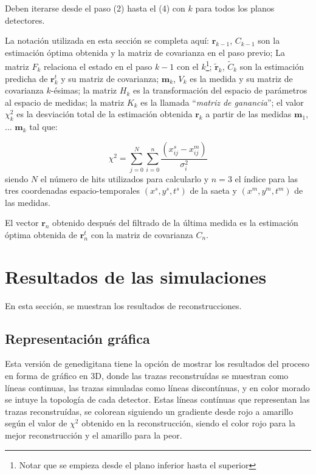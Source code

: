 \documentclass[a4paper]{article}
\let\vec\mathbf  %
\begin{document}
Deben iterarse desde el paso (2) hasta el (4) con $k$ para todos los planos detectores.

La notación utilizada en esta sección se completa aquí: $\vec{r}_{k - 1}$, $C_{k - 1}$ son la estimación óptima obtenida y la matriz de covarianza en el paso previo; La matriz $F_k$ relaciona el estado en el paso $k - 1$ con el $k$\footnote{Notar que se empieza desde el plano inferior hasta el superior}; $\tilde{\vec{r}}_k$, $\tilde{C}_k$ son la estimación predicha de $\vec{r}^t_k$ y su matriz de covarianza; $\vec{m}_k$, $V_k$ es la medida y su matriz de covarianza $k$-ésimas; la matriz $H_k$ es la transformación del espacio de parámetros al espacio de medidas; la matriz $K_k$ es la llamada ``\textit{matriz de ganancia}''; el valor $\chi^2_k$ es la desviación total de la estimación obtenida $\vec{r}_k$ a partir de las medidas $\vec{m}_1$, ... $\vec{m}_k$ tal que:

\begin{equation}
    \chi^2 = \sum_{j = 0}^{N} \sum_{i = 0}^{n} \frac{\left(x^{s}_{ij} - x^{m}_{ij} \right)}{\sigma_{i}^2}
\end{equation}
siendo $N$ el número de hits utilizados para calcularlo y $n = 3$ el índice para las tres coordenadas espacio-temporales $(x^s, y^s, t^s)$ de la saeta y $(x^m, y^m, t^m)$ de las medidas.

El vector $\vec{r}_n$ obtenido después del filtrado de la última medida es la estimación óptima obtenida de $\vec{r}^t_n$ con la matriz de covarianza $C_n$.


\section{Resultados de las simulaciones}

En esta sección, se muestran los resultados de reconstrucciones. 

\subsection{Representación gráfica}

Esta versión de genedigitana tiene la opción de mostrar los resultados del proceso en forma de gráfico en 3D, donde las trazas reconstruídas se muestran como líneas continuas, las trazas simuladas como líneas discontínuas, y en color morado se intuye la topología de cada detector. Estas líneas contínuas que representan las trazas reconstruídas, se colorean siguiendo un gradiente desde rojo a amarillo según el valor de $\chi^2$ obtenido en la reconstrucción, siendo el color rojo para la mejor reconstrucción y el amarillo para la peor.
\end{document}
